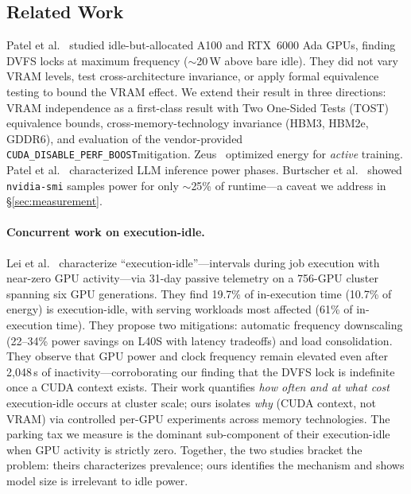 \documentclass[sigconf,nonacm]{acmart}
\newcommand{\perfboost}{\texttt{CUDA\_\hspace{0pt}DISABLE\_\hspace{0pt}PERF\_\hspace{0pt}BOOST}}
\begin{document}
\subsection{Related Work}

Patel et al.~\cite{patel-cal23} studied idle-but-allocated A100 and RTX~6000 Ada GPUs, finding DVFS locks at maximum frequency ($\sim$20\,W above bare idle). They did not vary VRAM levels, test cross-architecture invariance, or apply formal equivalence testing to bound the VRAM effect. We extend their result in three directions: VRAM independence as a first-class result with Two One-Sided Tests (TOST) equivalence bounds, cross-memory-technology invariance (HBM3, HBM2e, GDDR6), and evaluation of the vendor-provided \perfboost mitigation. Zeus~\cite{zeus} optimized energy for \emph{active} training. Patel et al.~\cite{patel-asplos24} characterized LLM inference power phases. Burtscher et al.~\cite{burtscher-power} showed \texttt{nvidia-smi} samples power for only $\sim$25\% of runtime---a caveat we address in \S\ref{sec:measurement}.

\paragraph{Concurrent work on execution-idle.} Lei et al.~\cite{lei-idle} characterize ``execution-idle''---intervals during job execution with near-zero GPU activity---via 31-day passive telemetry on a 756-GPU cluster spanning six GPU generations. They find 19.7\% of in-execution time (10.7\% of energy) is execution-idle, with serving workloads most affected (61\% of in-execution time). They propose two mitigations: automatic frequency downscaling (22--34\% power savings on L40S with latency tradeoffs) and load consolidation. They observe that GPU power and clock frequency remain elevated even after 2{,}048\,s of inactivity---corroborating our finding that the DVFS lock is indefinite once a CUDA context exists. Their work quantifies \emph{how often and at what cost} execution-idle occurs at cluster scale; ours isolates \emph{why} (CUDA context, not VRAM) via controlled per-GPU experiments across memory technologies. The parking tax we measure is the dominant sub-component of their execution-idle when GPU activity is strictly zero. Together, the two studies bracket the problem: theirs characterizes prevalence; ours identifies the mechanism and shows model size is irrelevant to idle power.
\end{document}
